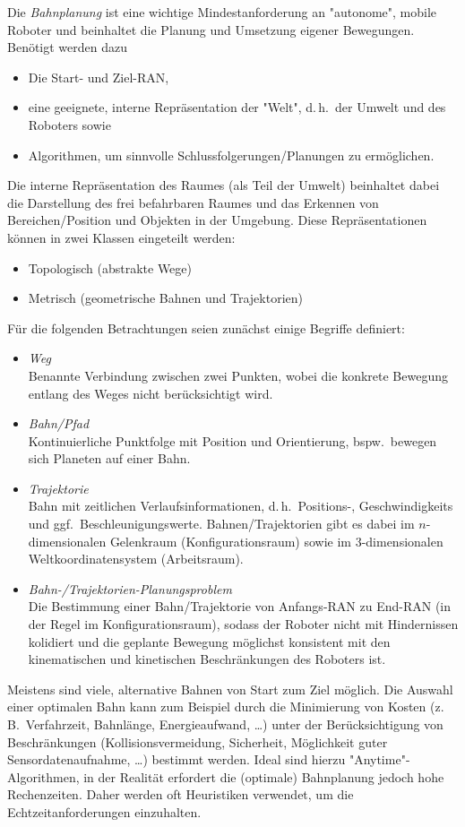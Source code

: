 \documentclass[a4paper, 11pt, accentcolor = tud3b]{tudreport}
\renewcommand{\dh}{d.\,h.~}
\newcommand{\bspw}{bspw.~}
\newcommand{\zB}{z.\,B.~}
\newcommand{\ggf}{ggf.~}
\begin{document}
		Die \emph{Bahnplanung} ist eine wichtige Mindestanforderung an "autonome", mobile Roboter und beinhaltet die Planung und Umsetzung eigener Bewegungen. Benötigt werden dazu
		\begin{itemize}
			\item Die Start- und Ziel-RAN,
			\item eine geeignete, interne Repräsentation der "Welt", \dh der Umwelt und des Roboters sowie
			\item Algorithmen, um sinnvolle Schlussfolgerungen/Planungen zu ermöglichen.
		\end{itemize}
		Die interne Repräsentation des Raumes (als Teil der Umwelt) beinhaltet dabei die Darstellung des frei befahrbaren Raumes und das Erkennen von Bereichen/Position und Objekten in der Umgebung. Diese Repräsentationen können in zwei Klassen eingeteilt werden:
		\begin{itemize}
			\item Topologisch (abstrakte Wege)
			\item Metrisch (geometrische Bahnen und Trajektorien)
		\end{itemize}
		Für die folgenden Betrachtungen seien zunächst einige Begriffe definiert:
		\begin{itemize}
			\item \emph{Weg} \\ Benannte Verbindung zwischen zwei Punkten, wobei die konkrete Bewegung entlang des Weges nicht berücksichtigt wird.
			\item \emph{Bahn/Pfad} \\ Kontinuierliche Punktfolge mit Position und Orientierung, \bspw bewegen sich Planeten auf einer Bahn.
			\item \emph{Trajektorie} \\ Bahn mit zeitlichen Verlaufsinformationen, \dh Positions-, Geschwindigkeits und \ggf Beschleunigungswerte. Bahnen/Trajektorien gibt es dabei im \(n\)-dimensionalen Gelenkraum (Konfigurationsraum) sowie im \num{3}-dimensionalen Weltkoordinatensystem (Arbeitsraum).
			\item \emph{Bahn-/Trajektorien-Planungsproblem} \\ Die Bestimmung einer Bahn/Trajektorie von Anfangs-RAN zu End-RAN (in der Regel im Konfigurationsraum), sodass der Roboter nicht mit Hindernissen kolidiert und die geplante Bewegung möglichst konsistent mit den kinematischen und kinetischen Beschränkungen des Roboters ist.
		\end{itemize}
		Meistens sind viele, alternative Bahnen von Start zum Ziel möglich. Die Auswahl einer optimalen Bahn kann zum Beispiel durch die Minimierung von Kosten (\zB Verfahrzeit, Bahnlänge, Energieaufwand, \dots) unter der Berücksichtigung von Beschränkungen (Kollisionsvermeidung, Sicherheit, Möglichkeit guter Sensordatenaufnahme, \dots) bestimmt werden. Ideal sind hierzu "Anytime"-Algorithmen, in der Realität erfordert die (optimale) Bahnplanung jedoch hohe Rechenzeiten. Daher werden oft Heuristiken verwendet, um die Echtzeitanforderungen einzuhalten.
		
\end{document}
